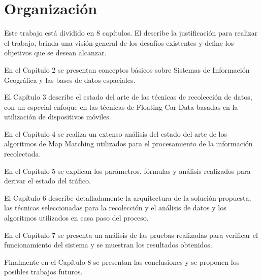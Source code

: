 \section{Organización}

Este trabajo está dividido en 8 capítulos. El  describe la justificación para realizar el trabajo, brinda una visión general de los desafíos existentes y define los objetivos que se desean alcanzar.

En el Capítulo 2 se presentan conceptos básicos sobre Sistemas de Información Geográfica y las bases de datos espaciales.

El Capítulo 3 describe el estado del arte de las técnicas de recolección de datos, con un especial enfoque en las técnicas de Floating Car Data basadas en la utilización de dispositivos móviles. 

En el Capítulo 4 se realiza un extenso análisis del estado del arte de los algoritmos de Map Matching utilizados para el procesamiento de la información recolectada.

En el Capítulo 5 se explican los parámetros, fórmulas y análisis realizados para derivar el estado del tráfico.

El Capítulo 6 describe detalladamente la arquitectura de la solución propuesta, las técnicas seleccionadas para la recolección y el análisis de datos y los algoritmos utilizados en casa paso del proceso.

En el Capítulo 7 se presenta un análisis de las pruebas realizadas para verificar el funcionamiento del sistema y se muestran los resultados obtenidos.

Finalmente en el Capítulo 8 se presentan las conclusiones y se proponen los posibles trabajos futuros.
